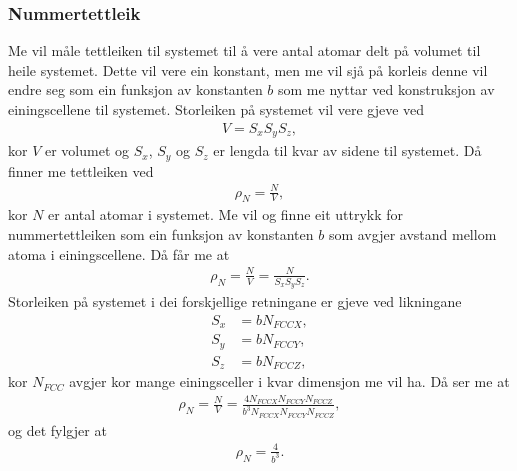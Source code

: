 \documentclass[12pt, a4paper]{article}
\theoremstyle{definition} \newtheorem*{definition}{Teorem}
\begin{document}
        \subsubsection*{Nummertettleik}
            Me vil måle tettleiken til systemet til å vere antal atomar delt på volumet til heile systemet. Dette vil vere ein konstant, men me vil sjå på korleis denne vil 
            endre seg som ein funksjon av konstanten $b$ som me nyttar ved konstruksjon av einingscellene til systemet. Storleiken på systemet vil vere gjeve ved
            \begin{align*}
                V = S_xS_yS_z,
            \end{align*}
            kor $V$ er volumet og $S_x$, $S_y$ og $S_z$ er lengda til kvar av sidene til systemet. Då finner me tettleiken ved
            \begin{align*}
                \rho_N = \frac{N}{V},
            \end{align*}
            kor $N$ er antal atomar i systemet. Me vil og finne eit uttrykk for nummertettleiken som ein funksjon av konstanten $b$ som avgjer avstand mellom atoma i 
            einingscellene. Då får me at
            \begin{align*}
                \rho_N = \frac{N}{V} = \frac{N}{S_xS_yS_z}.
            \end{align*}
            Storleiken på systemet i dei forskjellige retningane er gjeve ved likningane
            \begin{align*}
                S_x &= bN_{FCCX}, \\
                S_y &= bN_{FCCY}, \\
                S_z &= bN_{FCCZ},
            \end{align*}
            kor $N_{FCC}$ avgjer kor mange einingsceller i kvar dimensjon me vil ha. Då ser me at 
            \begin{align*}
                \rho_N = \frac{N}{V} = \frac{4N_{FCCX}N_{FCCY}N_{FCCZ}}{b^3N_{FCCX}N_{FCCY}N_{FCCZ}},
            \end{align*}
            og det fylgjer at
            \begin{align*}
                \rho_N = \frac{4}{b^3}.
            \end{align*}
\end{document}
